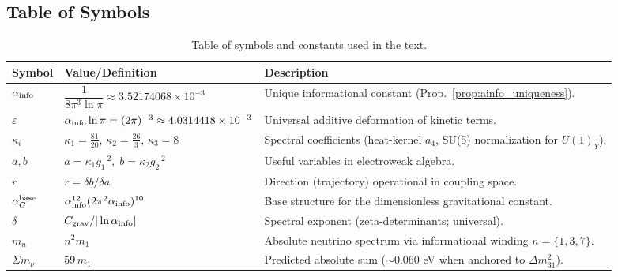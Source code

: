 \documentclass{article}
\numberwithin{equation}{section}
\theoremstyle{plain}
\theoremstyle{definition}
\theoremstyle{remark}
\begin{document}
\subsection{Table of Symbols}
\label{subsec:symbols}

\begin{table}[H]
\centering
\small
\caption{Table of symbols and constants used in the text.}
\label{tab:symbols}
\begin{tabular}{@{}llp{7.8cm}@{}}
\toprule
Symbol & Value/Definition & Description \\ \midrule
$\alpha_{\rm info}$ & $\dfrac{1}{8\pi^3\ln\pi}\approx 3.52174068\times10^{-3}$ & Unique informational constant (Prop.~\ref{prop:ainfo_uniqueness}). \\
$\varepsilon$ & $\alpha_{\rm info}\ln\pi=(2\pi)^{-3}\approx 4.0314418\times10^{-3}$ & Universal additive deformation of kinetic terms. \\
$\kappa_i$ & $\kappa_1=\tfrac{81}{20},\,\kappa_2=\tfrac{26}{3},\,\kappa_3=8$ & Spectral coefficients (heat-kernel $a_4$, SU(5) normalization for $U(1)_Y$). \\
$a,b$ & $a=\kappa_1 g_1^{-2},\; b=\kappa_2 g_2^{-2}$ & Useful variables in electroweak algebra. \\
$r$ & $r=\delta b/\delta a$ & Direction (trajectory) operational in coupling space. \\
$\alpha_G^{\rm base}$ & $\alpha_{\rm info}^{12}(2\pi^2\alpha_{\rm info})^{10}$ & Base structure for the dimensionless gravitational constant. \\
$\delta$ & $C_{\rm grav}/|\ln\alpha_{\rm info}|$ & Spectral exponent (zeta-determinants; universal). \\
$m_n$ & $n^2 m_1$ & Absolute neutrino spectrum via informational winding $n=\{1,3,7\}$. \\
$\Sigma m_\nu$ & $59\,m_1$ & Predicted absolute sum ($\sim 0.060$ eV when anchored to $\Delta m_{31}^2$). \\
\bottomrule
\end{tabular}
\end{table}
\end{document}

